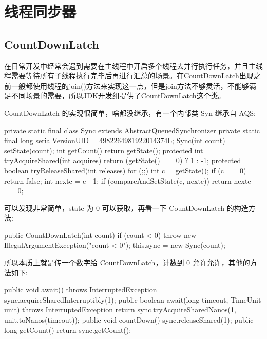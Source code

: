 \section{线程同步器}
\subsection{CountDownLatch}

在日常开发中经常会遇到需要在主线程中开启多个线程去并行执行任务，并且主线程需要等待所有子线程执行完毕后再进行汇总的场景。在CountDownLatch出现之前一般都使用线程的join()方法来实现这一点，但是join方法不够灵活，不能够满足不同场景的需要，所以JDK开发组提供了CountDownLatch这个类。

CountDownLatch 的实现很简单，啥都没继承，有一个内部类 Syn 继承自 AQS:

\begin{Java}
private static final class Sync extends AbstractQueuedSynchronizer {
    private static final long serialVersionUID = 4982264981922014374L;
    Sync(int count) {
        setState(count);
    }
    int getCount() {
        return getState();
    }
    protected int tryAcquireShared(int acquires) {
        return (getState() == 0) ? 1 : -1;
    }
    protected boolean tryReleaseShared(int releases) {
        for (;;) {
            int c = getState();
            if (c == 0)
                return false;
            int nextc = c - 1;
            if (compareAndSetState(c, nextc))
                return nextc == 0;
        }
    }
}
\end{Java}

可以发现非常简单，state 为 0 可以获取，再看一下 CountDownLatch 的构造方法:

\begin{Java}
public CountDownLatch(int count) {
    if (count < 0) throw new IllegalArgumentException("count < 0");
    this.sync = new Sync(count);
}
\end{Java}

所以本质上就是传一个数字给 CountDownLatch，计数到 0 允许允许，其他的方法如下:

\begin{Java}
public void await() throws InterruptedException {
    sync.acquireSharedInterruptibly(1);
}
public boolean await(long timeout, TimeUnit unit)
    throws InterruptedException {
    return sync.tryAcquireSharedNanos(1, unit.toNanos(timeout));
}
public void countDown() {
    sync.releaseShared(1);
}
public long getCount() {
    return sync.getCount();
}
\end{Java}

